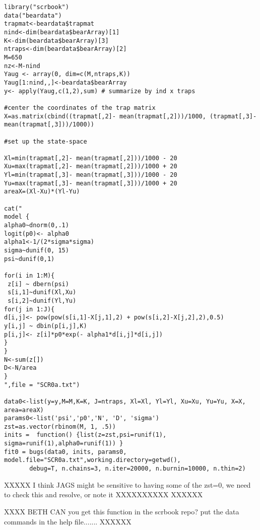 {\small
\begin{verbatim}
library("scrbook")
data("beardata")
trapmat<-beardata$trapmat
nind<-dim(beardata$bearArray)[1]
K<-dim(beardata$bearArray)[3]
ntraps<-dim(beardata$bearArray)[2]
M=650
nz<-M-nind
Yaug <- array(0, dim=c(M,ntraps,K))
Yaug[1:nind,,]<-beardata$bearArray 
y<- apply(Yaug,c(1,2),sum) # summarize by ind x traps

#center the coordinates of the trap matrix
X=as.matrix(cbind((trapmat[,2]- mean(trapmat[,2]))/1000, (trapmat[,3]- mean(trapmat[,3]))/1000))

#set up the state-space 

Xl=min(trapmat[,2]- mean(trapmat[,2]))/1000 - 20
Xu=max(trapmat[,2]- mean(trapmat[,2]))/1000 + 20
Yl=min(trapmat[,3]- mean(trapmat[,3]))/1000 - 20
Yu=max(trapmat[,3]- mean(trapmat[,3]))/1000 + 20
areaX=(Xl-Xu)*(Yl-Yu)

cat("
model {
alpha0~dnorm(0,.1)
logit(p0)<- alpha0
alpha1<-1/(2*sigma*sigma)
sigma~dunif(0, 15)
psi~dunif(0,1)

for(i in 1:M){
 z[i] ~ dbern(psi)
 s[i,1]~dunif(Xl,Xu)
 s[i,2]~dunif(Yl,Yu)
for(j in 1:J){
d[i,j]<- pow(pow(s[i,1]-X[j,1],2) + pow(s[i,2]-X[j,2],2),0.5)
y[i,j] ~ dbin(p[i,j],K)
p[i,j]<- z[i]*p0*exp(- alpha1*d[i,j]*d[i,j])
}
}
N<-sum(z[])
D<-N/area
}
",file = "SCR0a.txt")

data0<-list(y=y,M=M,K=K, J=ntraps, Xl=Xl, Yl=Yl, Xu=Xu, Yu=Yu, X=X, area=areaX)
params0<-list('psi','p0','N', 'D', 'sigma')
zst=as.vector(rbinom(M, 1, .5))
inits =  function() {list(z=zst,psi=runif(1), sigma=runif(1),alpha0=runif(1)) }
fit0 = bugs(data0, inits, params0, model.file="SCR0a.txt",working.directory=getwd(),    
       debug=T, n.chains=3, n.iter=20000, n.burnin=10000, n.thin=2)
\end{verbatim}
}
XXXXX I think JAGS might be sensitive to having some of the zst=0, we
need to check this and resolve, or note it XXXXXXXXXX XXXXXX

XXXX BETH CAN you get this function in the scrbook repo? put the data 
commands in the help file....... XXXXXX

